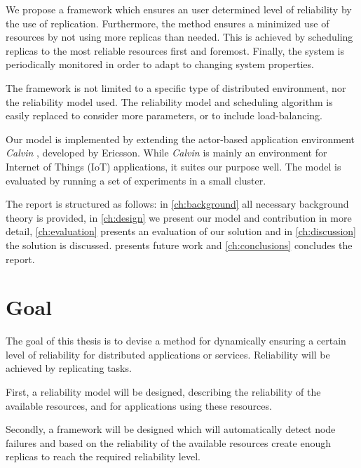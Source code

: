 \documentclass{cslthse-msc}
\begin{document}
We propose a framework which ensures an user determined level of reliability by the use of replication. Furthermore, the method ensures a minimized use of resources by not using more replicas than needed. This is achieved by scheduling replicas to the most reliable resources first and foremost. Finally, the system is periodically monitored in order to adapt to changing system properties.

The framework is not limited to a specific type of distributed environment, nor the reliability model used. The reliability model and scheduling algorithm is easily replaced to consider more parameters, or to include load-balancing.


Our model is implemented by extending the actor-based application environment \emph{Calvin} \cite{calvin}, developed by Ericsson. While \emph{Calvin} is mainly an environment for Internet of Things (IoT) applications, it suites our purpose well. The model is evaluated by running a set of experiments in a small cluster. %

The report is structured as follows: in \cref{ch:background} all necessary background theory is provided, in \cref{ch:design} we present our model and contribution in more detail, \cref{ch:evaluation} presents an evaluation of our solution and in \cref{ch:discussion} the solution is discussed.  presents future work and \cref{ch:conclusions} concludes the report. 

\section{Goal} \label{sec:introduction_goals}
The goal of this thesis is to devise a method for dynamically ensuring a certain level of reliability for distributed applications or services. Reliability will be achieved by replicating tasks.

First, a reliability model will be designed, describing the reliability of the available resources, and for applications using these resources.

Secondly, a framework will be designed which will automatically detect node failures and based on the reliability of the available resources create enough replicas to reach the required reliability level.
\end{document}

